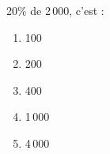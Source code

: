 20\% de 2\,000, c'est :
\begin{multicols}{5}
  \begin{enumerate}[A/]
  \item 100
  \item 200
  \item 400
  \item 1\,000
  \item 4\,000
  \end{enumerate}
\end{multicols}